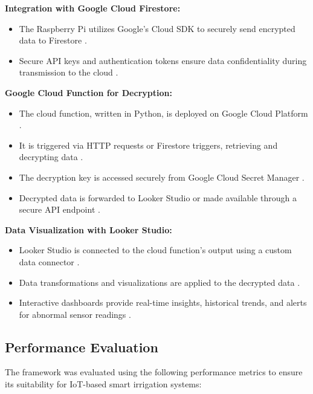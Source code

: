 \documentclass[journal]{Definitions/mdpi}
\begin{document}
\textbf{Integration with Google Cloud Firestore:}
\begin{itemize}
    \item The Raspberry Pi utilizes Google's Cloud SDK to securely send encrypted data to Firestore \cite{ref-cloud1}.
    \item Secure API keys and authentication tokens ensure data confidentiality during transmission to the cloud \cite{ref-cloud3}.
\end{itemize}

\textbf{Google Cloud Function for Decryption:}
\begin{itemize}
    \item The cloud function, written in Python, is deployed on Google Cloud Platform \cite{ref-cloud3}.
    \item It is triggered via HTTP requests or Firestore triggers, retrieving and decrypting data \cite{ref-cloud4}.
    \item The decryption key is accessed securely from Google Cloud Secret Manager \cite{ref-cloud4}.
    \item Decrypted data is forwarded to Looker Studio or made available through a secure API endpoint \cite{ref-cloud2}.
\end{itemize}

\textbf{Data Visualization with Looker Studio:}
\begin{itemize}
    \item Looker Studio is connected to the cloud function's output using a custom data connector \cite{ref-cloud2}.
    \item Data transformations and visualizations are applied to the decrypted data \cite{ref-cloud2}.
    \item Interactive dashboards provide real-time insights, historical trends, and alerts for abnormal sensor readings \cite{ref-cloud2}.
\end{itemize}

\subsection{Performance Evaluation}

The framework was evaluated using the following performance metrics to ensure its suitability for IoT-based smart irrigation systems:
\end{document}
